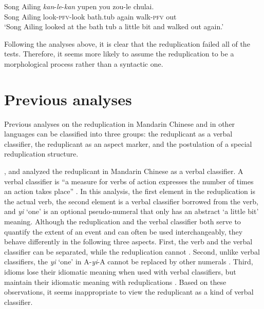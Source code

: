 \documentclass[11pt,a4paper,fleqn,draft]{article}
\let\textbf\emph
\begin{document}
   \ex\label{ex:co-redup2}
   \gll Song Ailing \textbf{kan}-\textbf{le}-\textbf{kan} yupen you zou-le chulai.\\
   Song Ailing look-\textsc{pfv}-look bath.tub again walk-\textsc{pfv} out\\  
   \glt `Song Ailing looked at the bath tub a little bit and walked out again.'
   \z
\z


Following the analyses above, it is clear that the reduplication failed all of the tests. 
Therefore, it seems more likely to assume the reduplication to be a morphological process rather than a syntactic one. 




\section{Previous analyses}\label{ch:prev}

Previous analyses on the reduplication in Mandarin Chinese and in other languages can be classified
into three groups: the reduplicant as a verbal classifier, the reduplicant as an aspect marker, and
the postulation of a special reduplication structure.


\citet{Chao1968}, \citet{Fan1964} and \citet{Xiong2016} analyzed the reduplicant in Mandarin Chinese
as a verbal classifier. 
A verbal classifier is ``a measure for verbs of action expresses the number of times an action takes place” \citep[615]{Chao1968}.
In this analysis, the first element in the reduplication is the actual verb, 
the second element is a verbal classifier borrowed from the verb, 
and \emph{yi} `one' is an optional pseudo-numeral that only has an abstract `a little bit' meaning.
Although the reduplication and the verbal classifier both serve to quantify the extent of an event and can often be used interchangeably, 
they behave differently in the following three aspects.
First, the verb and the verbal classifier can be separated, while the reduplication cannot \citep[269]{Paris2013}.
Second, unlike verbal classifiers, the \emph{yi} ‘one’ in A-\emph{yi}-A cannot be replaced by other numerals \citep[299--230]{YangWei2017}.
Third, idioms lose their idiomatic meaning when used with verbal classifiers, 
but maintain their idiomatic meaning with reduplications \citep[230--231]{YangWei2017}.
Based on these observations, it seems inappropriate to view the reduplicant as a kind of verbal classifier.
\end{document}

